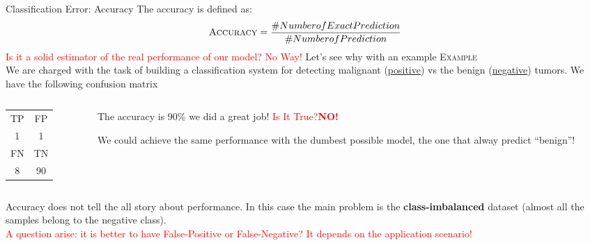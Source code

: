\documentclass{beamer}
\begin{document}
\begin{frame}{Classification Error: Accuracy}
\small
The accuracy is defined as:
\[
 \textsc{Accuracy} = \frac{\# Number of Exact Prediction}{\# Number of Prediction}
\]
\pause
\textcolor{red}{Is it a solid estimator of the real performance of our model?}
\pause
\textcolor{red}{No Way!}
Let's see why with an example
\vskip 0.2cm
\textsc{Example}\\
We are charged with the task of building a classification system for detecting malignant (\underline{positive}) vs the benign (\underline{negative}) tumors. We have the following confusion matrix
\begin{columns}
\begin{column}{0.3\textwidth}
\begin{tabular}{c|c}
\textsc{TP} & \textsc{FP} \\
1 & 1 \\
\hline
\textsc{FN} & \textsc{TN} \\
8 & 90 \\
\end{tabular}
\end{column}
\begin{column}{0.8\textwidth}
\pause
The accuracy is 90\% we did a great job! \textcolor{red}{Is It True?}\pause \textcolor{red}{\textbf{NO!}}

We could achieve the same performance with the dumbest possible model, the one that alway predict ``benign''!
\end{column}
\end{columns}
\pause
\vskip 0.2cm
Accuracy does not tell the all story about performance. In this case the main problem is the \textbf{class-imbalanced}
dataset (almost all the samples belong to the negative class). \\
\textcolor{red}{A question arise: it is better to have False-Positive or False-Negative?}\pause
\textcolor{red}{It depends on the application scenario!}
\end{frame}
\end{document}
